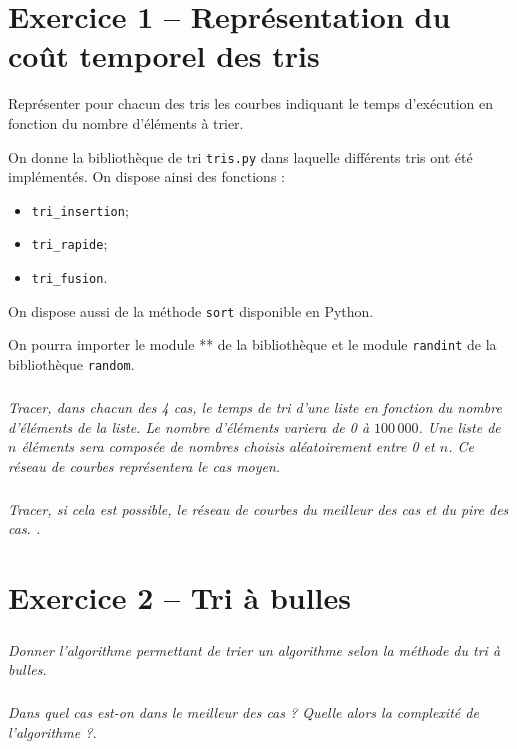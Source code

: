 \documentclass[10pt,fleqn]{article} %
\begin{document}

\vspace{8cm}
\pagestyle{fancy}
\thispagestyle{plain}


\def\columnseprulecolor{\color{ocre}}
\setlength{\columnseprule}{0.4pt} 
\begin{multicols}{2}

\section*{Exercice 1 -- Représentation du coût temporel des tris}

\begin{obj}
Représenter pour chacun des tris les courbes indiquant le temps d'exécution en fonction du nombre d'éléments à trier.
\end{obj}
On donne la bibliothèque de tri \texttt{tris.py} dans laquelle différents tris ont été implémentés.
On dispose ainsi des fonctions : 
\begin{itemize}
\item \texttt{tri\_insertion};
\item \texttt{tri\_rapide};
\item \texttt{tri\_fusion}.
\end{itemize}
On dispose aussi de la méthode \texttt{sort} disponible en Python.

On pourra importer le module ** de la bibliothèque \texttt{} et le module \texttt{randint} de la bibliothèque \texttt{random}.


\subparagraph{}
\textit{Tracer, dans chacun des 4 cas, le temps de tri d'une liste en fonction du nombre d'éléments de la liste. Le nombre d'éléments variera de 0 à $100\,000$. Une liste de $n$ éléments sera composée de nombres choisis aléatoirement entre 0 et $n$. Ce réseau de courbes représentera le cas moyen.}

\subparagraph{}
\textit{Tracer, si cela est possible, le réseau de courbes du meilleur des cas et du pire des cas. .}

\section*{Exercice 2 -- Tri à bulles}
\setcounter{exo}{0}
\subparagraph{}
\textit{Donner l'algorithme permettant de trier un algorithme selon la méthode du tri à bulles.}
\ifprof
\begin{corrige}
\end{corrige}
\else
\fi

\subparagraph{}
\textit{Dans quel cas est-on dans le meilleur des cas ? Quelle alors la complexité de l'algorithme ?.}


\end{multicols}
\end{document}
